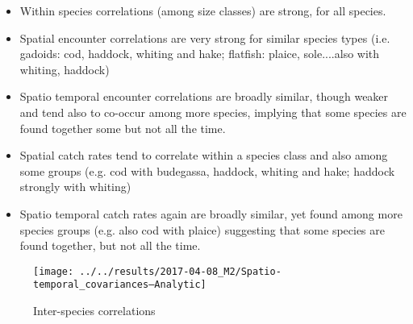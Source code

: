 \documentclass[11pt]{article}
\begin{document}
\begin{itemize}
	\item Within species correlations (among size classes) are strong, for
		all species. 
	\item Spatial encounter correlations are very strong for similar
		species types (i.e. gadoids: cod, haddock, whiting and hake;
		flatfish: plaice, sole....also with whiting, haddock)
	\item Spatio temporal encounter correlations are broadly similar,
		though weaker and tend also to co-occur among more species,
		implying that some species are found together some but not all
		the time.
	\item  Spatial catch rates tend to correlate within a species class and
		also among some groups (e.g. cod with budegassa, haddock,
		whiting and hake; haddock strongly with whiting)
	\item Spatio temporal catch rates again are broadly similar, yet found
		among more species groups (e.g. also cod with plaice)
		suggesting that some species are found together, but not all
		the time.

\end{itemize}

\begin{figure}[!ht]
	\texttt{[image: ../../results/2017-04-08\_M2/Spatio-temporal\_covariances--Analytic]}
	\label{fig:Corr}
	\caption{Inter-species correlations}
\end{figure}

\newpage
\end{document}
